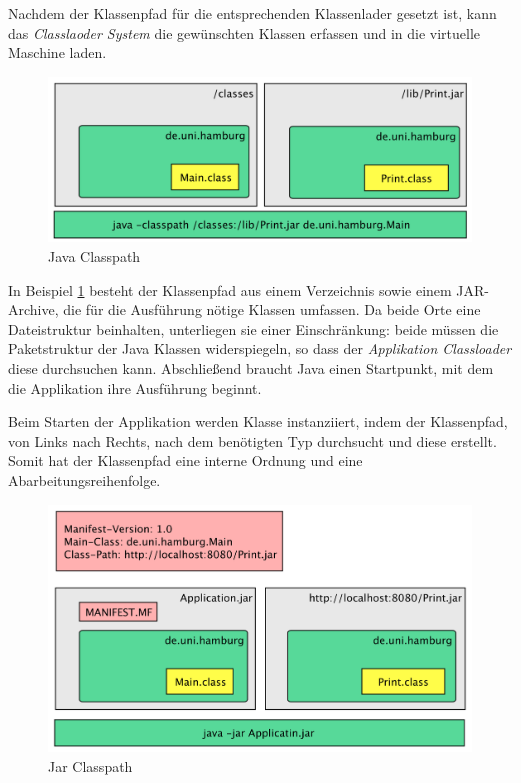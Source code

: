   Nachdem der Klassenpfad für die entsprechenden Klassenlader gesetzt ist, kann das \textit{Classlaoder System} die gewünschten Klassen erfassen und in die virtuelle Maschine laden.

  \begin{figure}[h]
    \includegraphics[width=\textwidth]{material/images/Classpath.png}
    \caption{Java Classpath}
    \label{fig:cps}
  \end{figure}

  In Beispiel \ref{fig:cps} besteht der Klassenpfad aus einem Verzeichnis sowie einem JAR-Archive, die für die Ausführung nötige Klassen umfassen. Da beide Orte eine Dateistruktur beinhalten, unterliegen sie einer Einschränkung: beide müssen die Paketstruktur der Java Klassen widerspiegeln, so dass der \textit{Applikation Classloader} diese durchsuchen kann. Abschließend braucht Java einen Startpunkt, mit dem die Applikation ihre Ausführung beginnt. 

  Beim Starten der Applikation werden Klasse instanziiert, indem der Klassenpfad, von Links nach Rechts, nach dem benötigten Typ durchsucht und diese erstellt. Somit hat der Klassenpfad eine interne Ordnung und eine Abarbeitungsreihenfolge.

  \begin{figure}[h]
    \includegraphics[width=\textwidth]{material/images/Classpath-Manifest.png}
    \caption{Jar Classpath}
    \label{fig:cpa}
  \end{figure}

